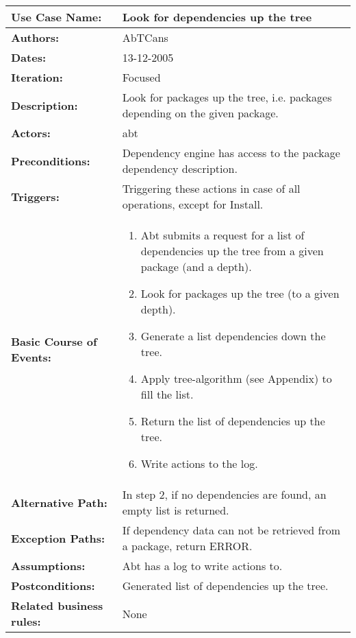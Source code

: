 \begin{tabularx}{\linewidth}{|l|X|}
\hline
\textbf{Use Case Name:} & \textbf{Look for dependencies up the tree} \\
\hline
\textbf{Authors:} & AbTCans\\
\hline
\textbf{Dates:} & 13-12-2005\\
\hline
\textbf{Iteration:} & Focused\\
\hline
\textbf{Description:} & Look for packages up the tree, i.e. packages depending on the given package.\\
\hline
\textbf{Actors:} & abt \\ 
\hline
\textbf{Preconditions:} & Dependency engine has access to the package dependency description.\\
\hline
\textbf{Triggers:} & Triggering these actions in case of all operations, except for Install.\\
\hline
\textbf{Basic Course of Events:} & 
\begin{minipage}{\linewidth} 
  \vspace{0.05em}
  \begin{enumerate}
   \item Abt submits a request for a list of dependencies up the tree from a given package (and a depth).
   \item Look for packages up the tree (to a given depth).
   \item Generate a list dependencies down the tree.
   \item Apply tree-algorithm (see Appendix) to fill the list.
   \item Return the list of dependencies up the tree.
   \item Write actions to the log.
  \end{enumerate}
  \vspace{0.05em}
\end{minipage}
\\
\hline 
\textbf{Alternative Path:} & In step 2, if no dependencies are found, an empty list is returned.\\
\hline
\textbf{Exception Paths:} & If dependency data can not be retrieved from a package, return ERROR. \\
\hline
\textbf{Assumptions:} & Abt has a log to write actions to. \\
\hline

\textbf{Postconditions:} & Generated list of dependencies up the tree.\\
\hline
\textbf{Related business rules:} & None\\
\hline
\end{tabularx}


  